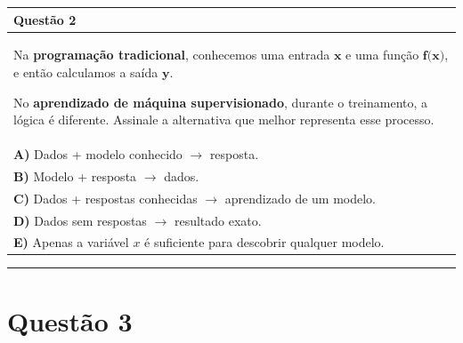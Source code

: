 \documentclass[
]{book}
\begin{document}
\begin{longtable}[]{@{}
  >{\raggedright\arraybackslash}p{}@{}}
\toprule\noalign{}
\begin{minipage}[b]{\linewidth}\raggedright
\textbf{Questão 2}
\end{minipage} \\
\midrule\noalign{}
\endhead
\bottomrule\noalign{}
\endlastfoot
Na \textbf{programação tradicional}, conhecemos uma entrada \(\textbf{x}\) e
uma função \(\textbf{f(x)}\), e então calculamos a saída \(\textbf{y}\).

No \textbf{aprendizado de máquina supervisionado}, durante o treinamento,
a lógica é diferente. Assinale a alternativa que melhor representa
esse processo. \\
\textbf{A)} Dados + modelo conhecido \(\rightarrow\) resposta. \\
\textbf{B)} Modelo + resposta \(\rightarrow\) dados. \\
\textbf{C)} Dados + respostas conhecidas \(\rightarrow\) aprendizado de um
modelo. \\
\textbf{D)} Dados sem respostas \(\rightarrow\) resultado exato. \\
\textbf{E)} Apenas a variável \(x\) é suficiente para descobrir qualquer
modelo. \\
\end{longtable}

\begin{center}\rule{0.5\linewidth}{0.5pt}\end{center}

\section{Questão 3}\label{questuxe3o-3}
\end{document}
